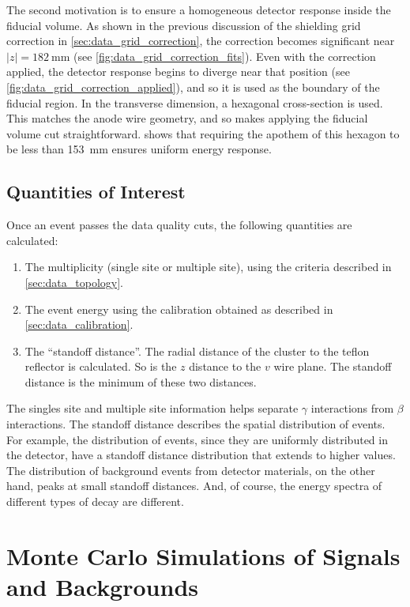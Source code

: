 \documentclass[herrin-thesis.tex]{subfiles}
\begin{document}
The second motivation is to ensure a homogeneous detector response inside the fiducial volume. As shown in the previous discussion of the shielding grid correction in \cref{sec:data_grid_correction}, the correction becomes significant near \(|z|=\SI{182}{\mm}\) (see \cref{fig:data_grid_correction_fits}). Even with the correction applied, the detector response begins to diverge near that position (see \cref{fig:data_grid_correction_applied}), and so it is used as the boundary of the fiducial region. In the transverse dimension, a hexagonal cross-section is used. This matches the anode wire geometry, and so makes applying the fiducial volume cut straightforward.  shows that requiring the apothem of this hexagon to be less than \SI{153}{\mm} ensures uniform energy response.

\subsection{Quantities of Interest}
\label{sec:analysis_quantities_of_interest}
Once an event passes the data quality cuts, the following quantities are calculated:
\begin{enumerate}
\item The multiplicity (single site or multiple site), using the criteria described in \cref{sec:data_topology}.
\item The event energy using the calibration obtained as described in \cref{sec:data_calibration}.
\item The ``standoff distance''. The radial distance of the cluster to the teflon reflector is calculated. So is the \(z\) distance to the \(v\) wire plane. The standoff distance is the minimum of these two distances.
\end{enumerate}

The singles site and multiple site information helps separate \(\gamma\) interactions from \(\beta\) interactions. The standoff distance describes the spatial distribution of events. For example, the distribution of \twonu{} events, since they are uniformly distributed in the detector, have a standoff distance distribution that extends to higher values. The distribution of background events from detector materials, on the other hand, peaks at small standoff distances. And, of course, the energy spectra of different types of decay are different.

\section{Monte Carlo Simulations of Signals and Backgrounds}
\label{sec:analysis_monte_carlo}
\end{document}
